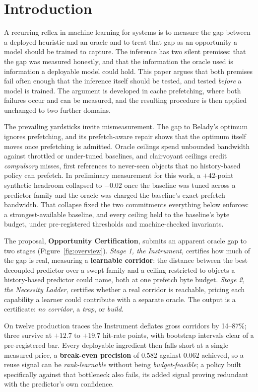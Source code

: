 \documentclass[letterpaper]{article} %
\begin{document}
\section{Introduction}
A recurring reflex in machine learning for systems is to measure the gap between a deployed heuristic and an oracle and to treat that gap as an opportunity a model should be trained to capture. The inference has two silent premises: that the gap was measured honestly, and that the information the oracle used is information a deployable model could hold. This paper argues that both premises fail often enough that the inference itself should be tested, and tested \emph{before} a model is trained. The argument is developed in cache prefetching, where both failures occur and can be measured, and the resulting procedure is then applied unchanged to two further domains.

The prevailing yardsticks invite mismeasurement. The gap to Belady's optimum \citep{belady} ignores prefetching, and its prefetch-aware repair \citep{demandmin} shows that the optimum itself moves once prefetching is admitted. Oracle ceilings spend unbounded bandwidth against throttled or under-tuned baselines, and clairvoyant ceilings credit \emph{compulsory} misses, first references to never-seen objects that no history-based policy can prefetch. In preliminary measurement for this work, a $+42$-point synthetic headroom collapsed to $-0.02$ once the baseline was tuned across a predictor family and the oracle was charged the baseline's exact prefetch bandwidth. That collapse fixed the two commitments everything below enforces: a strongest-available baseline, and every ceiling held to the baseline's byte budget, under pre-registered thresholds and machine-checked invariants.

The proposal, \textbf{Opportunity Certification}, submits an apparent oracle gap to two stages (Figure~\ref{fig:overview}). \emph{Stage 1, the Instrument,} certifies how much of the gap is real, measuring a \textbf{learnable corridor}: the distance between the best decoupled predictor over a swept family and a ceiling restricted to objects a history-based predictor could name, both at one prefetch byte budget. \emph{Stage 2, the Necessity Ladder,} certifies whether a real corridor is reachable, pricing each capability a learner could contribute with a separate oracle. The output is a certificate: \emph{no corridor}, a \emph{trap}, or \emph{build}.

On twelve production traces the Instrument deflates gross corridors by 14--87\%; three survive at $+12.7$ to $+19.7$ hit-rate points, with bootstrap intervals clear of a pre-registered bar. Every deployable ingredient then falls short at a single measured price, a \textbf{break-even precision} of $0.582$ against $0.062$ achieved, so a reuse signal can be \emph{rank-learnable} without being \emph{budget-feasible}; a policy built specifically against that bottleneck also fails, its added signal proving redundant with the predictor's own confidence.
\end{document}
